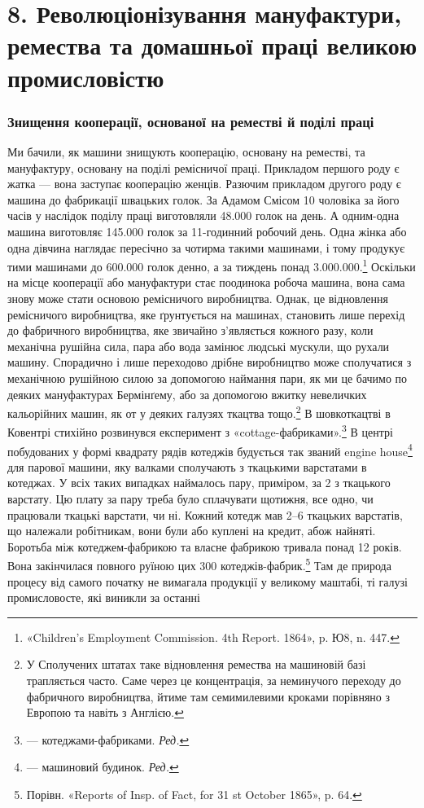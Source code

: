 \section*{8. Революціонізування мануфактури, ремества та домашньої
праці великою промисловістю}

\subsubsection{Знищення кооперації, основаної
на реместві й поділі праці}

Ми бачили, як машини знищують кооперацію, основану на
реместві, та мануфактуру, основану на поділі ремісничої
праці. Прикладом першого роду є жатка — вона заступає кооперацію
женців. Разючим прикладом другого роду є машина до
фабрикації швацьких голок. За Адамом Смісом 10 чоловіка за
його часів у наслідок поділу праці виготовляли \num{48.000} голок на
день. А одним-одна машина виготовляє \num{145.000} голок за 11-годинний
робочий день. Одна жінка або одна дівчина наглядає
пересічно за чотирма такими машинами, і тому продукує тими
машинами до \num{600.000} голок денно, а за тиждень понад \num{3.000.000}.\footnote{
«Children’s Employment Commission. 4th Report. 1864», p. Ю8,
n. 447.
}
Оскільки на місце кооперації або мануфактури стає поодинока
робоча машина, вона сама знову може стати основою ремісничого
виробництва. Однак, це відновлення ремісничого виробництва,
яке ґрунтується на машинах, становить лише перехід до фабричного
виробництва, яке звичайно з’являється кожного разу, коли
механічна рушійна сила, пара або вода замінює людські мускули,
що рухали машину. Спорадично і лише переходово дрібне виробництво
може сполучатися з механічною рушійною силою за
допомогою наймання пари, як ми це бачимо по деяких мануфактурах
Бермінґему, або за допомогою вжитку невеличких кальорійних
машин, як от у деяких галузях ткацтва тощо.\footnote{
У Сполучених штатах таке відновлення ремества на машиновій
базі трапляється часто. Саме через це концентрація, за неминучого переходу
до фабричного виробництва, йтиме там семимилевими кроками порівняно
з Европою та навіть з Англією.
} В шовкоткацтві в Ковентрі стихійно розвинувся експеримент з
«cottage-фабриками».\footnote*{
— котеджами-фабриками. \emph{Ред.}
}
В центрі побудованих у формі квадрату рядів котеджів
будується так званий engine house\footnote*{
— машиновий будинок. \emph{Ред.}
} для парової машини, яку валками сполучають з ткацькими варстатами в котеджах.
У всіх таких випадках наймалось пару, приміром, за 2
з ткацького варстату. Цю плату за пару треба було сплачувати
щотижня, все одно, чи працювали ткацькі варстати, чи ні. Кожний
котедж мав 2--6 ткацьких варстатів, що належали робітникам,
вони були або куплені на кредит, абож найняті. Боротьба між
котеджем-фабрикою та власне фабрикою тривала понад 12 років.
Вона закінчилася повного руїною цих 300 котеджів-фабрик.\footnote{
Порівн. «Reports of Insp. of Fact, for 31 st October 1865», p. 64.
} Там де природа процесу від самого початку не вимагала продукції у великому
маштабі, ті галузі промисловосте, які виникли за останні
\parbreak{}  %
